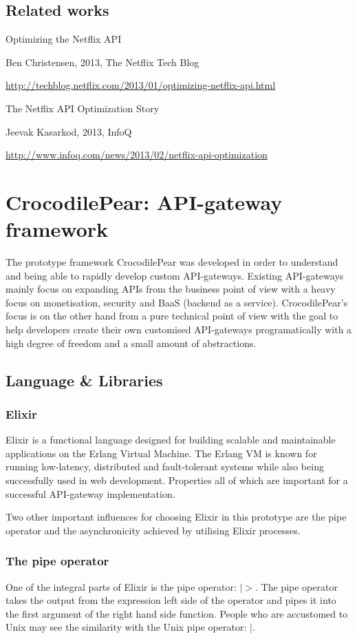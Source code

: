 \documentclass{cslthse-msc}
\begin{document}
\section{Related works}
Optimizing the Netflix API

Ben Christensen, 2013, The Netflix Tech Blog

\url{http://techblog.netflix.com/2013/01/optimizing-netflix-api.html}

The Netflix API Optimization Story

Jeevak Kasarkod, 2013, InfoQ

\url{http://www.infoq.com/news/2013/02/netflix-api-optimization}

\chapter{CrocodilePear: API-gateway framework}

The prototype framework CrocodilePear was developed in order to understand and being able to rapidly develop custom API-gateways. Existing API-gateways mainly focus on expanding APIs from the business point of view with a heavy focus on monetisation, security and BaaS (backend as a service). CrocodilePear's focus is on the other hand from a pure technical point of view with the goal to help developers create their own customised API-gateways programatically with a high degree of freedom and a small amount of abstractions.

\section{Language \& Libraries}
\subsection{Elixir}
Elixir is a functional language designed for building scalable and maintainable applications on the Erlang Virtual Machine. The Erlang VM is known for running low-latency, distributed and fault-tolerant systems while also being successfully used in web development\cite{elixir}. Properties all of which are important for a successful API-gateway implementation.

Two other important influences for choosing Elixir in this prototype are the pipe operator and the asynchronicity achieved by utilising Elixir processes.

\subsection{The pipe operator}
One of the integral parts of Elixir is the pipe operator: $|>$. The pipe operator takes the output from the expression left side of the operator and pipes it into the first argument of the right hand side function. People who are accustomed to Unix may see the similarity with the Unix pipe operator: $|$.
\end{document}

